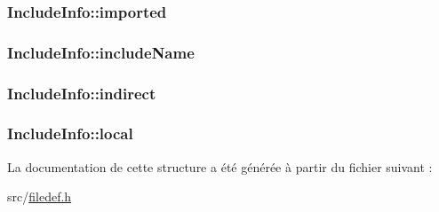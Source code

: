 \subsubsection[{imported}]{ Include\+Info\+::imported}\label{struct_include_info_a733eb5a7223f7619cfa7d5e390d5c224}
\hypertarget{struct_include_info_a0f8b77f07d748ea1612db5d4c47c5c37}{}
\subsubsection[{include\+Name}]{ Include\+Info\+::include\+Name}\label{struct_include_info_a0f8b77f07d748ea1612db5d4c47c5c37}
\hypertarget{struct_include_info_a14646bcb52c3c65d8fc0093614334c8e}{}
\subsubsection[{indirect}]{ Include\+Info\+::indirect}\label{struct_include_info_a14646bcb52c3c65d8fc0093614334c8e}
\hypertarget{struct_include_info_a1455653edfa732656ee4f77d72adae40}{}
\subsubsection[{local}]{ Include\+Info\+::local}\label{struct_include_info_a1455653edfa732656ee4f77d72adae40}


La documentation de cette structure a été générée à partir du fichier suivant \+:\begin{DoxyCompactItemize}
\item 
src/\hyperlink{filedef_8h}{filedef.\+h}\end{DoxyCompactItemize}
